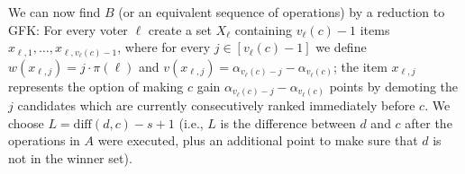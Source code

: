 \documentclass[letterpaper]{article} %
\newcommand{\CIK}{\textsc{GFK}}
\newcommand{\abs}[1]{\lvert{#1}\rvert}
\newcommand{\diff}{\mathrm{diff}}
\begin{document}

We can now find $B$ (or an equivalent sequence of operations) by a reduction to \CIK{}:
For every voter $\ell$ create a set $X_\ell$ containing $v_\ell(c)-1$ items $x_{\ell,1},\ldots,x_{\ell,v_\ell(c) - 1}$, where for every $j \in [v_\ell(c) - 1]$ we define $w(x_{\ell, j}) = j \cdot \pi(\ell)$ and $v(x_{\ell, j}) = \alpha_{v_\ell(c) - j} - \alpha_{v_\ell(c)}$; the item $x_{\ell, j}$ represents the option of making $c$ gain $\alpha_{v_\ell(c) - j} - \alpha_{v_\ell(c)}$ points by demoting the $j$ candidates which are currently consecutively ranked immediately before $c$. We choose $L = \diff(d, c) - s + 1$ (i.e., $L$ is the difference between $d$ and $c$ after  the operations in $A$ were executed, plus an additional point to make sure that $d$ is not in the winner set).
\end{document}
